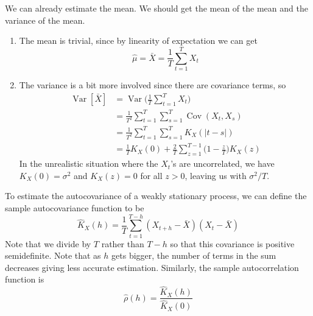 \documentclass{article}
\DeclareMathOperator{\Cov}{Cov}
\DeclareMathOperator{\Var}{Var}
\begin{document}
      \begin{theorem}
        We can already estimate the mean. We should get the mean of the mean and the variance of the mean. 
        \begin{enumerate}
          \item The mean is trivial, since by linearity of expectation we can get 
            \begin{equation}
              \hat{\mu} = \bar{X} = \frac{1}{T} \sum_{t=1}^T X_t
            \end{equation}

          \item The variance is a bit more involved since there are covariance terms, so 
            \begin{align}
              \Var[\bar{X}] & = \Var \bigg( \frac{1}{T} \sum_{t=1}^T X_t \bigg) \\
                            & = \frac{1}{T^2} \sum_{t=1}^T \sum_{s=1}^T \Cov(X_t, X_s) \\
                            & = \frac{1}{T^2} \sum_{t=1}^T \sum_{s=1}^T K_X (|t - s|) \\
                            & = \frac{1}{T} K_X (0) + \frac{2}{T} \sum_{z=1}^{T-1} \Big(1 - \frac{z}{T} \Big) K_X (z)
            \end{align} 
            In the unrealistic situation where the $X_t$'s are uncorrelated, we have $K_X (0) = \sigma^2$ and $K_X (z) = 0$ for all $z > 0$, leaving us with $\sigma^2 / T$. 
        \end{enumerate}
      \end{theorem}

      \begin{theorem}
        To estimate the autocovariance of a weakly stationary process, we can define the sample autocovariance function to be
        \begin{equation}
          \hat{K}_X (h) = \frac{1}{T} \sum_{t=1}^{T-h} (X_{t+h} - \bar{X}) (X_t - \bar{X})
        \end{equation}
        Note that we divide by $T$ rather than $T - h$ so that this covariance is positive semidefinite. Note that as $h$ gets bigger, the number of terms in the sum decreases giving less accurate estimation. Similarly, the sample autocorrelation function is 
        \begin{equation}
          \hat{\rho} (h) = \frac{\hat{K}_X (h)}{\hat{K}_X (0)}
        \end{equation}
      \end{theorem}
\end{document}
